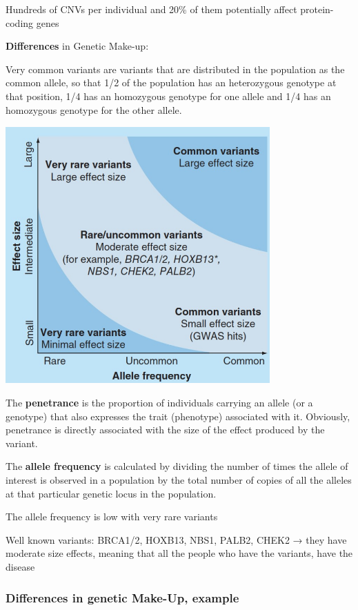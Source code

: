 Hundreds of CNVs per individual and 20\% of them potentially affect protein-
coding genes

\textbf{Differences} in Genetic Make-up:

Very common variants are variants that are distributed in the population as the
common allele, so that 1/2 of the population has an heterozygous genotype at
that position, 1/4 has an homozygous genotype for one allele and 1/4 has an
homozygous genotype for the other allele.

\includegraphics[width=3.9928in,height=3.87812in]{image4.jpeg}

The \textbf{penetrance} is the proportion of individuals carrying an allele (or
a genotype) that also expresses the trait (phenotype) associated with it.
Obviously, penetrance is directly associated with the size of the effect
produced by the variant.

The \textbf{allele frequency} is calculated by dividing the number of times the
allele of interest is observed in a population by the total number of copies of
all the alleles at that particular genetic locus in the population.

The allele frequency is low with very rare variants

Well known variants: BRCA1/2, HOXB13, NBS1, PALB2, CHEK2 → they have moderate
size effects, meaning that all the people who have the variants, have the
disease


\hypertarget{differences-in-genetic-make-up-example}{%
\subsubsection{Differences in genetic Make-Up,
example}\label{differences-in-genetic-make-up-example}}


